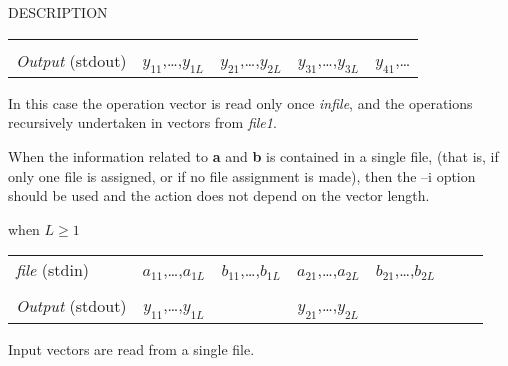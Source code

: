 \begin{qsection}{DESCRIPTION}
\begin{description}
\begin{tabular}{l|c|c|c|l}
\multicolumn{5}{c}{}	\\[-10pt]
			\cline{2-5}			
{\em Output} (stdout)	& {$y_{11}$,\dots,$y_{1L}$}
			& {$y_{21}$,\dots,$y_{2L}$}
			& {$y_{31}$,\dots,$y_{3L}$}
			& {$y_{41}$,\dots} \\ \cline{2-5}
\end{tabular}
\par
In this case the operation vector is read only once
{\em infile}, and the operations recursively undertaken
in vectors from {\em file1}.
\end{description}
\par
When the information related to {\bf a} and {\bf b} is contained
in a single file,
(that is, if only one file is assigned,
or if no file assignment is made),
then the --i option should be used
and the action does not depend on the vector length.
\begin{description}
\item{when $L\geq 1$}~\\
\begin{tabular}{l|c|c|c|c|l} \cline{2-6}
{\em file} (stdin)	& {$a_{11}$,\dots,$a_{1L}$}
			& {$b_{11}$,\dots,$b_{1L}$}
			& {$a_{21}$,\dots,$a_{2L}$}
			& {$b_{21}$,\dots,$b_{2L}$}
			& ~~~ \\ \cline{2-6}
\multicolumn{6}{c}{}	\\[-10pt]
			\cline{2-2} \cline{4-4} \cline{6-6}
{\em Output} (stdout)	& {$y_{11}$,\dots,$y_{1L}$} &
			& {$y_{21}$,\dots,$y_{2L}$} &
			& ~~~ \\
			\cline{2-2} \cline{4-4} \cline{6-6}
\end{tabular}
\par
Input vectors are read from a single file.
\end{description}
\end{qsection}

\begin{options}
\end{options}

